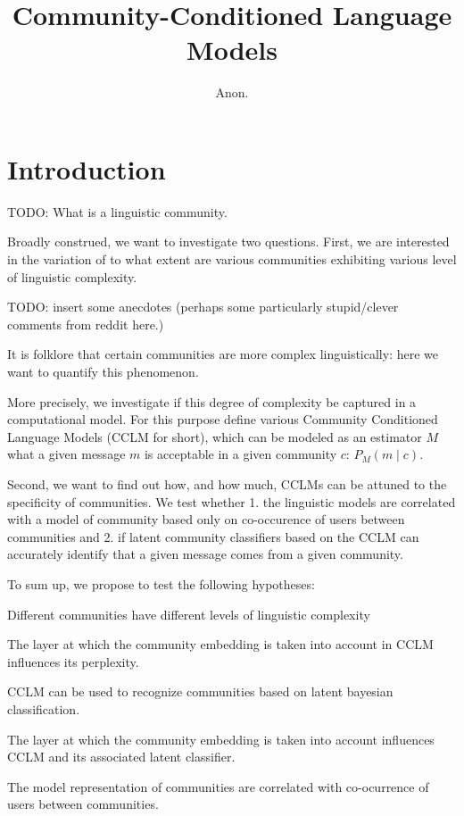 \documentclass[11pt,a4paper]{article}
\title{Community-Conditioned Language Models}
\author{Anon.}
\date{}
\begin{document}
\maketitle
\begin{abstract}
\end{abstract}


\section{Introduction}


TODO: What is a linguistic community. 

Broadly construed, we want to investigate two questions.  First, we
are interested in the variation of to what extent are various
communities exhibiting various level of linguistic complexity.

TODO: insert some anecdotes (perhaps some particularly stupid/clever
comments from reddit here.)

It is folklore that certain communities are more complex
linguistically: here we want to quantify this phenomenon.

More precisely, we investigate if this degree of complexity be
captured in a computational model.  For this purpose define various
Community Conditioned Language Models (CCLM for short), which can be
modeled as an estimator $M$ what a given message $m$ is acceptable in
a given community $c$: \(P_M(m \mid c)\).

Second, we want to find out how, and how much, CCLMs can be attuned to
the specificity of communities. We test whether 1. the linguistic
models are correlated with a model of community based only on
co-occurence of users between communities and 2. if latent community
classifiers based on the CCLM can accurately identify that a given message
comes from a given community.

To sum up, we propose to test the following hypotheses:
\begin{hypotheses}
\item Different communities have different levels of linguistic
  complexity
\item The layer at which the community embedding is taken into account
  in CCLM influences its perplexity.
\item CCLM can be used to recognize communities based on
  latent bayesian classification.
\item The layer at which the community embedding is taken into account
  influences CCLM and its associated latent classifier.
\item The model representation of communities are correlated with
  co-ocurrence of users between communities.
\end{hypotheses}
\end{document}
